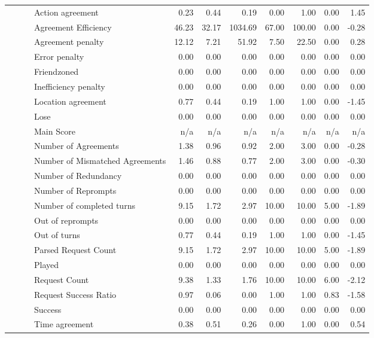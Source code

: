 \begin{tabular}{llllrrrrrrr}
 &  &  & Action agreement & 0.23 & 0.44 & 0.19 & 0.00 & 1.00 & 0.00 & 1.45 \\
 &  &  & Agreement Efficiency & 46.23 & 32.17 & 1034.69 & 67.00 & 100.00 & 0.00 & -0.28 \\
 &  &  & Agreement penalty & 12.12 & 7.21 & 51.92 & 7.50 & 22.50 & 0.00 & 0.28 \\
 &  &  & Error penalty & 0.00 & 0.00 & 0.00 & 0.00 & 0.00 & 0.00 & 0.00 \\
 &  &  & Friendzoned & 0.00 & 0.00 & 0.00 & 0.00 & 0.00 & 0.00 & 0.00 \\
 &  &  & Inefficiency penalty & 0.00 & 0.00 & 0.00 & 0.00 & 0.00 & 0.00 & 0.00 \\
 &  &  & Location agreement & 0.77 & 0.44 & 0.19 & 1.00 & 1.00 & 0.00 & -1.45 \\
 &  &  & Lose & 0.00 & 0.00 & 0.00 & 0.00 & 0.00 & 0.00 & 0.00 \\
 &  &  & Main Score & n/a & n/a & n/a & n/a & n/a & n/a & n/a \\
 &  &  & Number of Agreements & 1.38 & 0.96 & 0.92 & 2.00 & 3.00 & 0.00 & -0.28 \\
 &  &  & Number of Mismatched Agreements & 1.46 & 0.88 & 0.77 & 2.00 & 3.00 & 0.00 & -0.30 \\
 &  &  & Number of Redundancy & 0.00 & 0.00 & 0.00 & 0.00 & 0.00 & 0.00 & 0.00 \\
 &  &  & Number of Reprompts & 0.00 & 0.00 & 0.00 & 0.00 & 0.00 & 0.00 & 0.00 \\
 &  &  & Number of completed turns & 9.15 & 1.72 & 2.97 & 10.00 & 10.00 & 5.00 & -1.89 \\
 &  &  & Out of reprompts & 0.00 & 0.00 & 0.00 & 0.00 & 0.00 & 0.00 & 0.00 \\
 &  &  & Out of turns & 0.77 & 0.44 & 0.19 & 1.00 & 1.00 & 0.00 & -1.45 \\
 &  &  & Parsed Request Count & 9.15 & 1.72 & 2.97 & 10.00 & 10.00 & 5.00 & -1.89 \\
 &  &  & Played & 0.00 & 0.00 & 0.00 & 0.00 & 0.00 & 0.00 & 0.00 \\
 &  &  & Request Count & 9.38 & 1.33 & 1.76 & 10.00 & 10.00 & 6.00 & -2.12 \\
 &  &  & Request Success Ratio & 0.97 & 0.06 & 0.00 & 1.00 & 1.00 & 0.83 & -1.58 \\
 &  &  & Success & 0.00 & 0.00 & 0.00 & 0.00 & 0.00 & 0.00 & 0.00 \\
 &  &  & Time agreement & 0.38 & 0.51 & 0.26 & 0.00 & 1.00 & 0.00 & 0.54 \\

\end{tabular}
